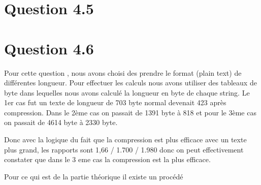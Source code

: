 \documentclass[12pt]{article}
\begin{document}
\section*{Question 4.5}


\section*{Question 4.6}
Pour cette question , nous avons choisi des prendre le format (plain text) de différentes longueur.
Pour effectuer les calculs nous avons utiliser des tableaux de byte dans lequelles nous avons calculé  la longueur en byte de chaque string.
Le 1er cas fut un texte de longueur de 703 byte normal devenait 423 après compression.
Dans le 2ème cas on passait de 1391 byte à 818 et pour le 3ème cas on passait de 4614 byte à 2330 byte.

Donc avec la logique du fait que la compression est plus efficace avec un texte plus grand,
les rapports sont 1,66 / 1.700 / 1.980 donc on peut effectivement constater que dans le 3 eme cas la
compression est la plus efficace.

Pour ce qui est de la partie théorique il existe un procédé 
\end{document}

